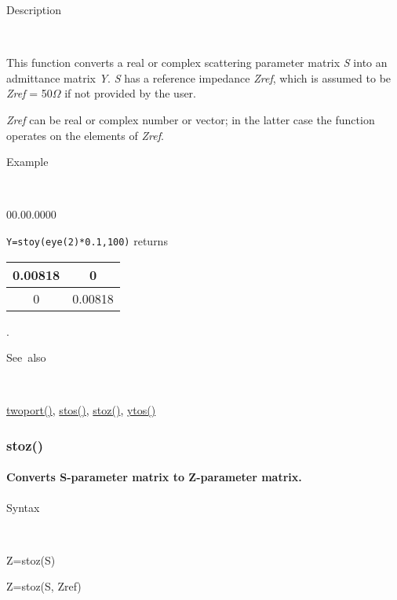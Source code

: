 \begin{description}
\item [Description]~
\end{description}
This function converts a real or complex scattering parameter matrix
\textit{S} into an admittance matrix \textit{Y}. \textit{S} has a
reference impedance \textit{Zref}, which is assumed to be \textit{Zref}
= 50$\Omega$ if not provided by the user.

\noindent \textit{Zref} can be real or complex number or vector; in
the latter case the function operates on the elements of \textit{Zref}.

\begin{description}
\item [Example]~
\end{description}
\begin{lyxlist}{00.00.0000}
\item [\texttt{Y=stoy(eye(2){*}0.1,100)}]returns \begin{tabular}{|c|c|}
\hline 
0.00818&
0\tabularnewline
\hline
0&
0.00818\tabularnewline
\hline
\end{tabular}.
\end{lyxlist}
\begin{description}
\item [See~also]~
\end{description}
\textcolor{blue}{\hyperlink{twoport}{twoport()}}\textcolor{black}{,}
\textcolor{blue}{\hyperlink{stos}{stos()}}\textcolor{black}{,} \textcolor{blue}{\hyperlink{stoz}{stoz()}}\textcolor{black}{,}
\textcolor{blue}{\hyperlink{ytos}{ytos()}}


\newpage
\subsubsection*{\hypertarget{stoz}{}{\Large stoz()}}


\paragraph{\label{par:stoz}Converts S-parameter matrix to Z-parameter matrix.}

\begin{description}
\item [Syntax]~
\end{description}
Z=stoz(S)

\noindent Z=stoz(S, Zref)

